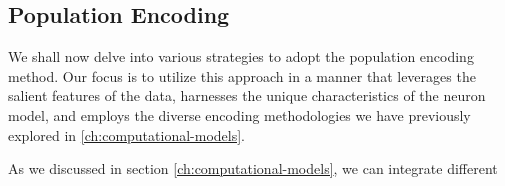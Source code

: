 \subsection{Population Encoding}

We shall now delve into various strategies to adopt the population encoding method. Our focus is to utilize this approach in a manner that leverages the salient features of the data, harnesses the unique characteristics of the neuron model, and employs the diverse encoding methodologies we have previously explored in \ref{ch:computational-models}.

As we discussed in section \ref{ch:computational-models}, we can integrate different 
